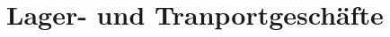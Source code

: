 \documentclass[11pt]{article}
\begin{document}
\chapter[Lager- und Transportgeschäfte]{Lager- und Tranportgeschäfte}

    \section[]{}
    
\end{document}

